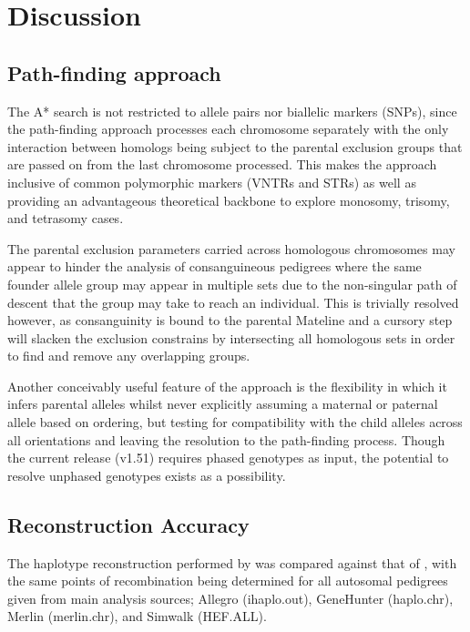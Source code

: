 \section{Discussion}

\subsection{Path-finding approach}

The A* search is not restricted to allele pairs nor biallelic markers (SNPs), since the path-finding approach processes each chromosome separately with the only interaction between homologs being subject to the parental exclusion groups that are passed on from the last chromosome processed. This makes the approach inclusive of common polymorphic markers (VNTRs and STRs) as well as providing an advantageous theoretical backbone to explore monosomy, trisomy, and tetrasomy cases.

The parental exclusion parameters carried across homologous chromosomes may appear to hinder the analysis of consanguineous pedigrees where the same founder allele group may appear in multiple sets due to the non-singular path of descent that the group may take to reach an individual. This is trivially resolved however, as consanguinity is bound to the parental Mateline and a cursory step will slacken the exclusion constrains by intersecting all homologous sets in order to find and remove any overlapping groups.

Another conceivably useful feature of the approach is the flexibility in which it infers parental alleles whilst never explicitly assuming a maternal or paternal allele based on ordering, but testing for compatibility with the child alleles across all orientations and leaving the resolution to the path-finding process. Though the current \haplo release (v1.51) requires phased genotypes as input, the potential to resolve unphased genotypes exists as a possibility.


\subsection{Reconstruction Accuracy}

The haplotype reconstruction performed by \haplo was compared against that of \hpainter, with the same points of recombination being determined for all autosomal pedigrees given from main analysis sources; Allegro (ihaplo.out), GeneHunter (haplo.chr), Merlin (merlin.chr), and Simwalk (HEF.ALL).

